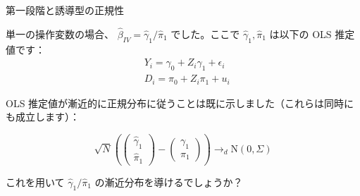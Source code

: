\documentclass[11pt,handout]{beamer}
\newenvironment{wideitemize}{\itemize\addtolength{\itemsep}{10pt}}{\enditemize}
\begin{document}
\begin{frame}{第一段階と誘導型の正規性}
	\begin{wideitemize}
		\item
		単一の操作変数の場合、 $\hat\beta_{IV} = \hat\gamma_1 / \hat\pi_1$ でした。ここで $\hat\gamma_1, \hat\pi_1$ は以下の OLS 推定値です：
		\begin{align*}
			&Y_{i} = \gamma_0 +   Z_i \gamma_1 + \epsilon_{i} \\
			&D_i = \pi_0 + Z_i \pi_1 + u_i
		\end{align*}
	
		\pause
		\item
		OLS 推定値が漸近的に正規分布に従うことは既に示しました（これらは同時にも成立します）：
		
		$$\sqrt{N}\left( \left( \begin{array}{ll} \hat\gamma_1 \\ \hat\pi_1 \end{array} \right)- \left( \begin{array}{ll} \gamma_1 \\ \pi_1 \end{array} \right) \right) \rightarrow_d \mathrm{N}(0,\Sigma)$$
	
		\pause
		\item
		これを用いて $\hat\gamma_1 / \hat\pi_1$ の漸近分布を導けるでしょうか？
	\end{wideitemize}
\end{frame}
\end{document}
